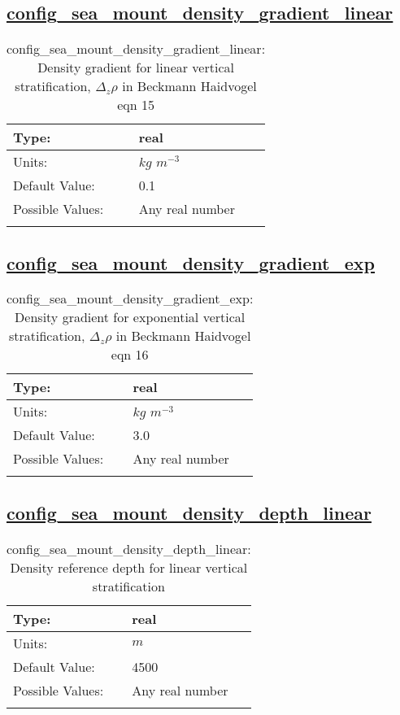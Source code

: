 \subsection[config\_sea\_mount\_density\_gradient\_linear]{\hyperref[sec:nm_tab_sea_mount]{config\_sea\_mount\_density\_gradient\_linear}}
\label{subsec:nm_sec_config_sea_mount_density_gradient_linear}
\begin{center}
\begin{longtable}{| p{2.0in} || p{4.0in} |}
    \hline
    Type: & real \\
    \hline
    Units: & $kg$ $m^{-3}$ \\
    \hline
    Default Value: & 0.1 \\
    \hline
    Possible Values: & Any real number \\
    \hline
    \caption{config\_sea\_mount\_density\_gradient\_linear:  Density gradient for linear vertical stratification,  $\Delta_z \rho$  in Beckmann Haidvogel eqn 15}
\end{longtable}
\end{center}
\subsection[config\_sea\_mount\_density\_gradient\_exp]{\hyperref[sec:nm_tab_sea_mount]{config\_sea\_mount\_density\_gradient\_exp}}
\label{subsec:nm_sec_config_sea_mount_density_gradient_exp}
\begin{center}
\begin{longtable}{| p{2.0in} || p{4.0in} |}
    \hline
    Type: & real \\
    \hline
    Units: & $kg$ $m^{-3}$ \\
    \hline
    Default Value: & 3.0 \\
    \hline
    Possible Values: & Any real number \\
    \hline
    \caption{config\_sea\_mount\_density\_gradient\_exp:  Density gradient for exponential vertical stratification,  $\Delta_z \rho$  in Beckmann Haidvogel eqn 16}
\end{longtable}
\end{center}
\subsection[config\_sea\_mount\_density\_depth\_linear]{\hyperref[sec:nm_tab_sea_mount]{config\_sea\_mount\_density\_depth\_linear}}
\label{subsec:nm_sec_config_sea_mount_density_depth_linear}
\begin{center}
\begin{longtable}{| p{2.0in} || p{4.0in} |}
    \hline
    Type: & real \\
    \hline
    Units: & $m$ \\
    \hline
    Default Value: & 4500 \\
    \hline
    Possible Values: & Any real number \\
    \hline
    \caption{config\_sea\_mount\_density\_depth\_linear: Density reference depth for linear vertical stratification}
\end{longtable}
\end{center}
